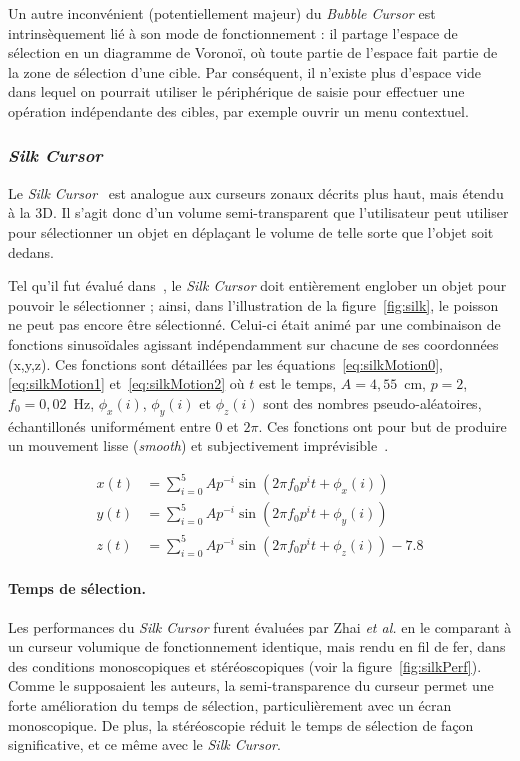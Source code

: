 	Un autre inconvénient (potentiellement majeur) du \emph{Bubble Cursor} est intrinsèquement lié à son mode de fonctionnement : il partage l'espace de sélection en un diagramme de Voronoï, où toute partie de l'espace fait partie de la zone de sélection d'une cible. Par conséquent, il n'existe plus d'espace \og vide \fg{} dans lequel on pourrait utiliser le périphérique de saisie pour effectuer une opération indépendante des cibles, par exemple ouvrir un menu contextuel.
	
	\subsubsection{\emph{Silk Cursor}}
	Le \emph{Silk Cursor}~\cite{zhai1994silk} est analogue aux curseurs zonaux décrits plus haut, mais étendu à la 3D. Il s'agit donc d'un volume semi-transparent que l'utilisateur peut utiliser pour sélectionner un objet en déplaçant le volume de telle sorte que l'objet soit dedans.
	
	Tel qu'il fut évalué dans~\cite{zhai1994silk}, le \emph{Silk Cursor} doit entièrement englober un objet pour pouvoir le sélectionner ; ainsi, dans l'illustration de la figure~\ref{fig:silk}, le poisson ne peut pas encore être sélectionné. Celui-ci était animé par une combinaison de fonctions sinusoïdales agissant indépendamment sur chacune de ses coordonnées (x,y,z). Ces fonctions sont détaillées par les équations~\ref{eq:silkMotion0}, \ref{eq:silkMotion1} et~\ref{eq:silkMotion2} où $t$ est le temps, $A = 4,55$~cm, $p = 2$, $f_{0} = 0,02$~Hz, 	$\phi_{x}(i)$, $\phi_{y}(i)$ et $\phi_{z}(i)$ sont des nombres pseudo-aléatoires, échantillonés uniformément entre $0$ et $2\pi$. Ces fonctions ont pour but de produire un mouvement lisse (\emph{smooth}) et subjectivement imprévisible~\cite{zhai1993human}.
	
	\begin{align}
		\label{eq:silkMotion0}
		x(t) &= \sum_{i=0}^{5} Ap^{-i} \sin \left( 2\pi{}f_{0}p^{i}t + \phi_{x}(i) \right) \\
		\label{eq:silkMotion1}
		y(t) &= \sum_{i=0}^{5} Ap^{-i} \sin \left( 2\pi{}f_{0}p^{i}t + \phi_{y}(i) \right) \\
		\label{eq:silkMotion2}
		z(t) &= \sum_{i=0}^{5} Ap^{-i} \sin \left( 2\pi{}f_{0}p^{i}t + \phi_{z}(i) \right) - 7.8
	\end{align}
	
	\paragraph{Temps de sélection.}
	Les performances du \emph{Silk Cursor} furent évaluées par Zhai \emph{et al.} en le comparant à un curseur volumique de fonctionnement identique, mais rendu en fil de fer, dans des conditions monoscopiques et stéréoscopiques (voir la figure~\ref{fig:silkPerf}). Comme le supposaient les auteurs, la semi-transparence du curseur permet une forte amélioration du temps de sélection, particulièrement avec un écran monoscopique. De plus, la stéréoscopie réduit le temps de sélection de façon significative, et ce même avec le \emph{Silk Cursor}.
	
